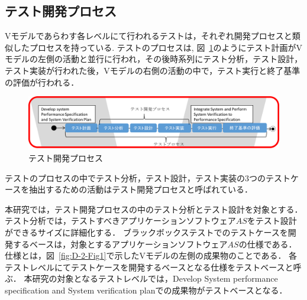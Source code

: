 \subsection{テスト開発プロセス}
Vモデルであらわす各レベルにて行われるテストは，それぞれ開発プロセスと類似したプロセスを持っている.
テストのプロセスは, 図~\ref{fig:D-2-Fig2J}のようにテスト計画がVモデルの左側の活動と並行に行われ，その後時系列にテスト分析，テスト設計，テスト実装が行われた後，Vモデルの右側の活動の中で，テスト実行と終了基準の評価が行われる．
\begin{figure}[htbp]
  \begin{center}
  \includegraphics[width=14cm]{./image/D-2-Fig2J.png}
  \caption{テスト開発プロセス}
  \label{fig:D-2-Fig2J}
  \end{center}
\end{figure}
テストのプロセスの中でテスト分析，テスト設計，テスト実装の3つのテストケースを抽出するための活動はテスト開発プロセスと呼ばれている\cite{ISTQB}．

本研究では，テスト開発プロセスの中のテスト分析とテスト設計を対象とする．
テスト分析では，テストすべきアプリケーションソフトウェア$AS$をテスト設計ができるサイズに詳細化する．
ブラックボックステストでのテストケースを開発するベースは，対象とするアプリケーションソフトウェア$AS$の仕様である\cite{stocks1996framework}．
仕様とは，図~\ref{fig:D-2-Fig1}で示したVモデルの左側の成果物のことである．
各テストレベルにてテストケースを開発するベースとなる仕様をテストベースと呼ぶ\cite{craig2002systematic}．
本研究の対象となるテストレベルでは，Develop System performance specification and System verification planでの成果物がテストベースとなる．

